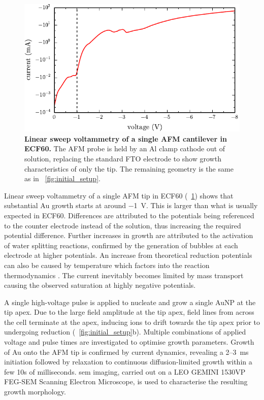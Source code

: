 \documentclass{article}
\begin{document}
\begin{figure}[bt]
\centering
\includegraphics{figures/initial_cv}
\caption[Linear sweep voltammetry of a single AFM cantilever in ECF60]{\textbf{Linear sweep voltammetry of a single AFM cantilever in ECF60.} The AFM probe is held by an Al clamp cathode out of solution, replacing the standard FTO electrode to show growth characteristics of only the tip. The remaining geometry is the same as in \figurename~\ref{fig:initial_setup}.}
\label{fig:initial_cv}
\end{figure}

Linear sweep voltammetry of a single AFM tip in ECF60 (\figurename~\ref{fig:initial_cv}) shows that substantial Au growth starts at around \SI{-1}{V}. This is larger than what is usually expected in ECF60. Differences are attributed to the potentials being referenced to the counter electrode instead of the solution, thus increasing the required potential difference. Further increases in growth are attributed to the activation of water splitting reactions, confirmed by the generation of bubbles at each electrode at higher potentials. An increase from theoretical reduction potentials can also be caused by temperature which factors into the reaction thermodynamics \cite{paunovic2006fundamentals}. The current inevitably becomes limited by mass transport causing the observed saturation at highly negative potentials.

A single high-voltage pulse is applied to nucleate and grow a single AuNP at the tip apex. Due to the large field amplitude at the tip apex, field lines from across the cell terminate at the apex, inducing ions to drift towards the tip apex prior to undergoing reduction (\figurename~\ref{fig:initial_setup}b).  Multiple combinations of applied voltage and pulse times are investigated to optimise growth parameters. Growth of Au onto the AFM tip is confirmed by current dynamics, revealing a 2--\SI{3}{ms} initiation followed by relaxation to continuous diffusion-limited growth within a few 10s of milliseconds. \Gls{sem} imaging, carried out on a LEO GEMINI 1530VP FEG-SEM Scanning Electron Microscope, is used to characterise the resulting growth morphology.
\end{document}
